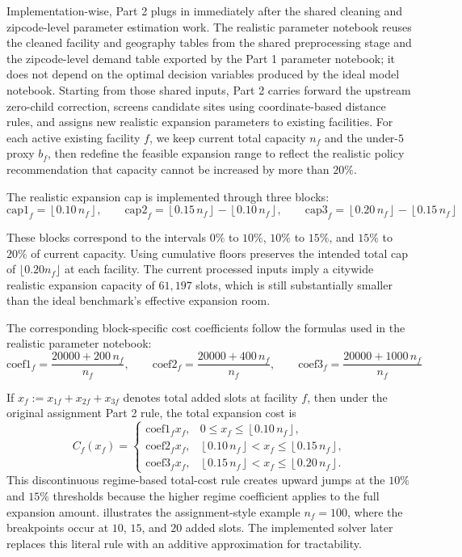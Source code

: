 \documentclass[11pt]{article}
\newcommand{\1}{\mathbb{I}}
\begin{document}
Implementation-wise, Part 2 plugs in immediately after the shared cleaning and zipcode-level parameter estimation work. The realistic parameter notebook reuses the cleaned facility and geography tables from the shared preprocessing stage and the zipcode-level demand table exported by the Part 1 parameter notebook; it does not depend on the optimal decision variables produced by the ideal model notebook. Starting from those shared inputs, Part 2 carries forward the upstream zero-child correction, screens candidate sites using coordinate-based distance rules, and assigns new realistic expansion parameters to existing facilities. For each active existing facility \(f\), we keep current total capacity \(n_f\) and the under-\(5\) proxy \(b_f\), then redefine the feasible expansion range to reflect the realistic policy recommendation that capacity cannot be increased by more than \(20\%\).

The realistic expansion cap is implemented through three blocks:
\[
\mathrm{cap1}_f = \left\lfloor 0.10\,n_f \right\rfloor,\qquad
\mathrm{cap2}_f = \left\lfloor 0.15\,n_f \right\rfloor - \left\lfloor 0.10\,n_f \right\rfloor,\qquad
\mathrm{cap3}_f = \left\lfloor 0.20\,n_f \right\rfloor - \left\lfloor 0.15\,n_f \right\rfloor
\]

These blocks correspond to the intervals \(0\%\) to \(10\%\), \(10\%\) to \(15\%\), and \(15\%\) to \(20\%\) of current capacity. Using cumulative floors preserves the intended total cap of \(\lfloor 0.20 n_f \rfloor\) at each facility. The current processed inputs imply a citywide realistic expansion capacity of \(61{,}197\) slots, which is still substantially smaller than the ideal benchmark's effective expansion room.

The corresponding block-specific cost coefficients follow the formulas used in the realistic parameter notebook:
\[
\mathrm{coef1}_f = \frac{20000 + 200\,n_f}{n_f},\qquad
\mathrm{coef2}_f = \frac{20000 + 400\,n_f}{n_f},\qquad
\mathrm{coef3}_f = \frac{20000 + 1000\,n_f}{n_f}
\]

If \(x_f := x_{1f}+x_{2f}+x_{3f}\) denotes total added slots at facility \(f\), then under the original assignment Part 2 rule, the total expansion cost is
\[
C_f(x_f)=
\begin{cases}
\mathrm{coef1}_f x_f, & 0 \le x_f \le \left\lfloor 0.10\,n_f \right\rfloor,\\
\mathrm{coef2}_f x_f, & \left\lfloor 0.10\,n_f \right\rfloor < x_f \le \left\lfloor 0.15\,n_f \right\rfloor,\\
\mathrm{coef3}_f x_f, & \left\lfloor 0.15\,n_f \right\rfloor < x_f \le \left\lfloor 0.20\,n_f \right\rfloor.
\end{cases}
\]
This discontinuous regime-based total-cost rule creates upward jumps at the \(10\%\) and \(15\%\) thresholds because the higher regime coefficient applies to the full expansion amount.  illustrates the assignment-style example \(n_f=100\), where the breakpoints occur at \(10\), \(15\), and \(20\) added slots. The implemented solver later replaces this literal rule with an additive approximation for tractability.
\end{document}
